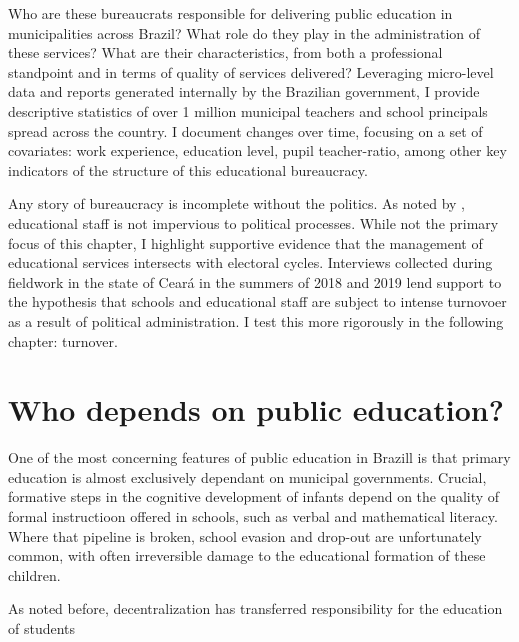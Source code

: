\documentclass[12pt,]{book}
\begin{document}
Who are these bureaucrats responsible for delivering public education in municipalities across Brazil? What role do they play in the administration of these services? What are their characteristics, from both a professional standpoint and in terms of quality of services delivered? Leveraging micro-level data and reports generated internally by the Brazilian government, I provide descriptive statistics of over 1 million municipal teachers and school principals spread across the country. I document changes over time, focusing on a set of covariates: work experience, education level, pupil teacher-ratio, among other key indicators of the structure of this educational bureaucracy.

Any story of bureaucracy is incomplete without the politics. As noted by \citet{eaton_teachers_2014}, educational staff is not impervious to political processes. While not the primary focus of this chapter, I highlight supportive evidence that the management of educational services intersects with electoral cycles. Interviews collected during fieldwork in the state of Ceará in the summers of 2018 and 2019 lend support to the hypothesis that schools and educational staff are subject to intense turnovoer as a result of political administration. I test this more rigorously in the following chapter: turnover.

\hypertarget{who-depends-on-public-education}{%
\section{Who depends on public education?}\label{who-depends-on-public-education}}

One of the most concerning features of public education in Brazill is that primary education is almost exclusively dependant on municipal governments. Crucial, formative steps in the cognitive development of infants depend on the quality of formal instructioon offered in schools, such as verbal and mathematical literacy. Where that pipeline is broken, school evasion and drop-out are unfortunately common, with often irreversible damage to the educational formation of these children.

As noted before, decentralization has transferred responsibility for the education of students
\end{document}
